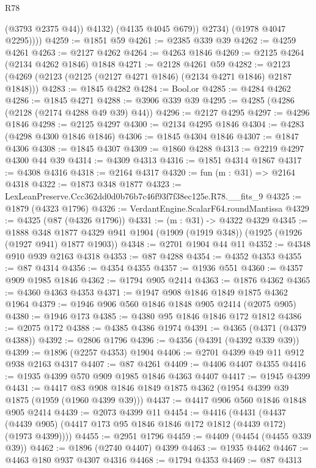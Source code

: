 \begin{lexlean}{R78}
\begin{coremodule}
                  (@3793 @2375 @44))
                @4132)
              (@4135 @4045 @679))
            @2734)
          (@1978 @4047 @2295))))
@4259 := @1851 @59
@4261 := @2385 @339 @39
@4262 := @4259 @4261
@4263 := @2127 @4262
@4264 := @4263 @1846
@4269 := @2125 @4264 (@2134 @4262 @1846) @1848
@4271 := @2128 @4261 @59
@4282 := @2123 (@4269 (@2123 (@2125 (@2127 @4271 @1846) (@2134 @4271 @1846) @2187 @1848)))
@4283 := @1845 @4282
@4284 := Bool.or
@4285 := @4284 @4262
@4286 := @1845 @4271
@4288 := @3906 @339 @39
@4295 := @4285 (@4286 (@2128 (@2174 @4288 @49 @39) @44))
@4296 := @2127 @4295
@4297 := @4296 @1846
@4298 := @2125 @4297
@4300 := @2134 @4295 @1846
@4304 := @4283 (@4298 @4300 @1846 @1846)
@4306 := @1845 @4304 @1846
@4307 := @1847 @4306
@4308 := @1845 @4307
@4309 := @1860 @4288
@4313 := @2219 @4297 @4300 @44 @39
@4314 := @4309 @4313
@4316 := @1851 @4314 @1867
@4317 := @4308 @4316
@4318 := @2164 @4317
@4320 := fun (m : @31) => @2164 @4318
@4322 := @1873 @348 @1877
@4323 := LexLeanPreserve.Ccc362dd0d0b76b7c46f93f7f38ec125e.R78.__fits_9
@4325 := @1879 (@4323 @1796)
@4326 := VerdantEngine.ScalarF64.roundMantissa
@4329 := @4325 (@87 (@4326 @1796))
@4331 := (m : @31) -> @4322 @4329
@4345 := @1888
    @348
    @1877
    @4329
    @941
    @1904
    (@1909 (@1919 @348))
    (@1925 (@1926 (@1927 @941) @1877 @1903))
@4348 := @2701 @1904 @44 @11
@4352 := @4348 @910 @939 @2163 @4318
@4353 := @87 @4288
@4354 := @4352 @4353
@4355 := @87 @4314
@4356 := @4354 @4355
@4357 := @1936 @551
@4360 := @4357 @909 @1985 @1846
@4362 := @1794 @905 @2414
@4363 := @1876 @4362
@4365 := @4360 @4363 @4353
@4371 := @1947 @908 @1846 @1849 @1875 @4362 @1964
@4379 := @1946 @906 @560 @1846 @1848 @905 @2414 (@2075 @905)
@4380 := @1946 @173
@4385 := @4380 @95 @1846 @1846 @172 @1812
@4386 := @2075 @172
@4388 := @4385 @4386 @1974
@4391 := @4365 (@4371 (@4379 @4388))
@4392 := @2806 @1796
@4396 := @4356 (@4391 (@4392 @339 @39))
@4399 := @1896 (@2257 @4353) @1904
@4406 := @2701 @4399 @49 @11 @912 @938 @2163 @4317
@4407 := @87 @4261
@4409 := @4406 @4407 @4355
@4416 := @1935 @4399 @570 @909 @1985 @1846 @4363 @4407
@4417 := @1945 @4399
@4431 := @4417 @83 @908 @1846 @1849 @1875 @4362 (@1954 @4399 @39 @1875 (@1959 (@1960 @4399 @39)))
@4437 := @4417 @906 @560 @1846 @1848 @905 @2414
@4439 := @2073 @4399 @11
@4454 := @4416
    (@4431 (@4437 (@4439 @905) (@4417 @173 @95 @1846 @1846 @172 @1812 (@4439 @172) (@1973 @4399))))
@4455 := @2951 @1796
@4459 := @4409 (@4454 (@4455 @339 @39))
@4462 := @1896 (@2740 @4407) @4399
@4463 := @1935 @4462
@4467 := @4463 @180 @937 @4307 @4316
@4468 := @1794 @4353
@4469 := @87 @4313

\end{coremodule}
\end{lexlean}
